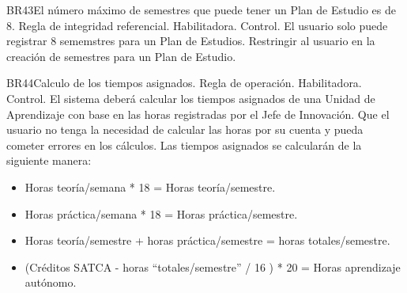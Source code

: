   
   \begin{BussinesRule}{BR43}{El número máximo de semestres que puede tener un Plan de Estudio es de 8.}
     \BRitem[Tipo:] Regla de integridad referencial.
     \BRitem[Clase:] Habilitadora.
     \BRitem[Nivel:] Control.
     \BRitem[Descripción:] El usuario solo puede registrar 8 sememstres para un Plan de Estudios.
     \BRitem[Motivación:] Restringir al usuario en la creación de semestres para un Plan de Estudio.
  \end{BussinesRule}

  
     \begin{BussinesRule}{BR44}{Calculo de los tiempos asignados.}
     \BRitem[Tipo:] Regla de operación.
     \BRitem[Clase:] Habilitadora.
     \BRitem[Nivel:] Control.
     \BRitem[Descripción:] El sistema deberá calcular los tiempos asignados de una Unidad de Aprendizaje con base en las horas registradas por el Jefe de Innovación.
     \BRitem[Motivación:] Que el usuario no tenga la necesidad de calcular las horas por su cuenta y pueda cometer errores en los cálculos.
     \BRitem[Sentencia:] Las tiempos asignados se calcularán de la siguiente manera: 
        \begin{itemize}
            \item Horas teoría/semana * 18 = Horas teoría/semestre.
            \item Horas práctica/semana * 18 = Horas práctica/semestre.
            \item Horas teoría/semestre + horas práctica/semestre  = horas totales/semestre.
            \item (Créditos SATCA - horas ``totales/semestre'' / 16 ) * 20 = Horas aprendizaje autónomo.
        \end{itemize}
  \end{BussinesRule}
